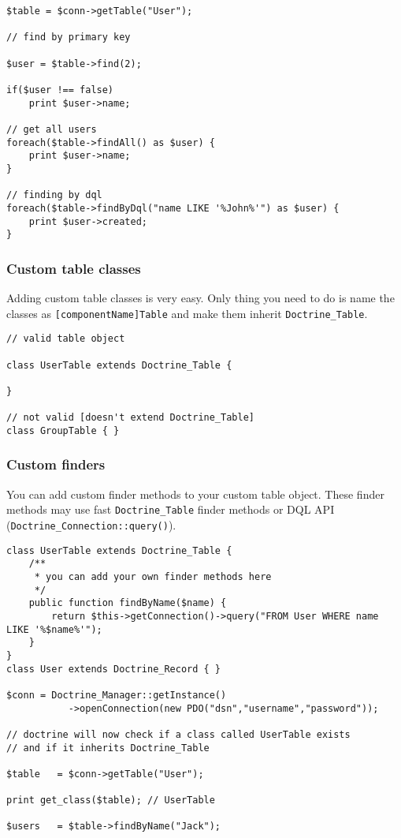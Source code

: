 \documentclass[11pt,a4paper]{report}
\begin{document}
\begin{verbatim}
$table = $conn->getTable("User");

// find by primary key

$user = $table->find(2);

if($user !== false)
    print $user->name;

// get all users
foreach($table->findAll() as $user) {
    print $user->name;
}

// finding by dql
foreach($table->findByDql("name LIKE '%John%'") as $user) {
    print $user->created;
}
\end{verbatim}

\subsubsection{Custom table classes}
Adding custom table classes is very easy. Only thing you need to do is name the classes as \texttt{[componentName]Table} and make them inherit \texttt{Doctrine\_Table}.

\begin{verbatim}
// valid table object

class UserTable extends Doctrine_Table {

}

// not valid [doesn't extend Doctrine_Table]
class GroupTable { }
\end{verbatim}

\subsubsection{Custom finders}
You can add custom finder methods to your custom table object. These finder methods may use fast \texttt{Doctrine\_Table} finder methods or DQL API (\texttt{Doctrine\_Connection::query()}).

\begin{verbatim}
class UserTable extends Doctrine_Table {
    /**
     * you can add your own finder methods here
     */
    public function findByName($name) {
        return $this->getConnection()->query("FROM User WHERE name LIKE '%$name%'");
    }
}
class User extends Doctrine_Record { }

$conn = Doctrine_Manager::getInstance()
           ->openConnection(new PDO("dsn","username","password"));

// doctrine will now check if a class called UserTable exists
// and if it inherits Doctrine_Table

$table   = $conn->getTable("User");

print get_class($table); // UserTable

$users   = $table->findByName("Jack");
\end{verbatim}
\end{document}
